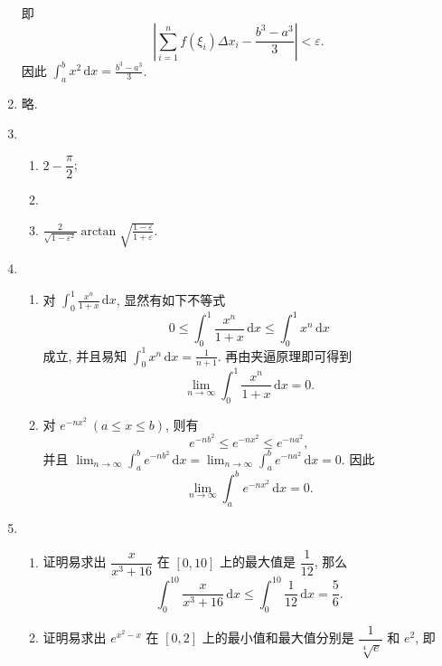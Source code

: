 \documentclass[a4paper, 11pt]{ctexart}
\newcommand{\dif}{\mathrm{d}}
\begin{document}
\begin{enumerate}
\[        \]
        即
        \[
            \left|\sum_{i=1}^nf(\xi_i)\Delta x_i - \frac{b^3-a^3}{3}\right| < \varepsilon.    
        \]
        因此 $\displaystyle{\int_a^b x^2}\,\dif x = \frac{b^3-a^3}{3}$.
    \item %
        略.
    \item %
        \begin{enumerate}[(1)]
            \item %
                $2-\dfrac\pi2$;
            \item %
            \item %
                $\displaystyle{
                    \frac{2}{\sqrt{1-\varepsilon^2}}\arctan\sqrt{\frac{1-\varepsilon}{1+\varepsilon}}
                }$.
        \end{enumerate}
    \item %
        \begin{enumerate}[(1)]
            \item %
                对 $\displaystyle{\int_0^1\frac{x^n}{1+x}\,\dif x}$, 显然有如下不等式
                \[
                    0 \leqslant \int_0^1\frac{x^n}{1+x}\,\dif x \leqslant \int_0^1x^n\,\dif x   
                \]
                成立, 并且易知 $\displaystyle{\int_0^1x^n\,\dif x = \frac{1}{n+1}}$. 再由夹逼原理即可得到
                \[
                    \lim_{n\to\infty}\int_0^1\frac{x^n}{1+x}\,\dif x = 0.   
                \]
            \item %
                对 $e^{-nx^2}\ (a \leqslant x \leqslant b)$, 则有 \[
                    e^{-nb^2} \leqslant e^{-nx^2} \leqslant e^{-na^2},
                \] 并且 $\displaystyle{
                    \lim_{n\to\infty}\int_a^b e^{-nb^2}\,\dif x = \lim_{n\to\infty}\int_a^b e^{-na^2}\,\dif x = 0
                }$. 因此
                \[
                    \lim_{n\to\infty}\int_a^b e^{-nx^2}\,\dif x = 0.  
                \]
        \end{enumerate}
    \item %
        \begin{enumerate}[(1)]
            \item %
                {\heiti 证明}\quad 易求出 $\dfrac{x}{x^3 + 16}$ 在 $[0, 10]$ 上的最大值是 $\dfrac{1}{12}$, 那么
                \[
                    \int_0^{10}\frac{x}{x^3+16}\,\dif x \leqslant \int_0^{10}\frac{1}{12}\,\dif x = \frac56.    
                \]
            \item %
                {\heiti 证明}\quad 易求出 $e^{x^2-x}$ 在 $[0, 2]$ 上的最小值和最大值分别是 $\dfrac{1}{\sqrt[4]{e}}$ 和 $e^2$, 即

\end{enumerate}
\end{enumerate}
\end{document}
